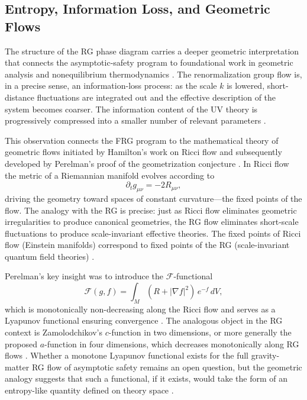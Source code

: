 \documentclass[12pt,a4paper]{article}
\begin{document}
\subsection{Entropy, Information Loss, and Geometric Flows}

The structure of the RG phase diagram carries a deeper geometric interpretation
that connects the asymptotic-safety program to foundational work in geometric
analysis and nonequilibrium thermodynamics \cite{Fisher1922,AmariNagaoka2000,
Ruppeiner1995}. The renormalization group flow is, in a precise sense, an
information-loss process: as the scale $k$ is lowered, short-distance fluctuations
are integrated out and the effective description of the system becomes coarser.
The information content of the UV theory is progressively compressed into a
smaller number of relevant parameters \cite{Amari2016,Goldenfeld1992}.

This observation connects the FRG program to the mathematical theory of
geometric flows initiated by Hamilton's work on Ricci flow \cite{Hamilton1982}
and subsequently developed by Perelman's proof of the geometrization conjecture
\cite{Perelman2002}. In Ricci flow the metric of a Riemannian manifold evolves
according to
\begin{equation}
\partial_t g_{\mu\nu} = -2R_{\mu\nu},
\end{equation}
driving the geometry toward spaces of constant curvature---the fixed points of
the flow. The analogy with the RG is precise: just as Ricci flow eliminates
geometric irregularities to produce canonical geometries, the RG flow eliminates
short-scale fluctuations to produce scale-invariant effective theories. The
fixed points of Ricci flow (Einstein manifolds) correspond to fixed points of
the RG (scale-invariant quantum field theories) \cite{Gromov1981,Burago2001}.

Perelman's key insight was to introduce the $\mathcal{F}$-functional
\begin{equation}
\mathcal{F}(g,f) = \int_M (R + |\nabla f|^2)\,e^{-f}\,dV,
\end{equation}
which is monotonically non-decreasing along the Ricci flow and serves as a
Lyapunov functional ensuring convergence \cite{Perelman2002}. The analogous
object in the RG context is Zamolodchikov's $c$-function in two dimensions,
or more generally the proposed $a$-function in four dimensions, which decreases
monotonically along RG flows \cite{Cardy1996,ZinnJustin2002}. Whether a
monotone Lyapunov functional exists for the full gravity-matter RG flow of
asymptotic safety remains an open question, but the geometric analogy suggests
that such a functional, if it exists, would take the form of an entropy-like
quantity defined on theory space \cite{Jaynes1957,Onsager1931}.
\end{document}
